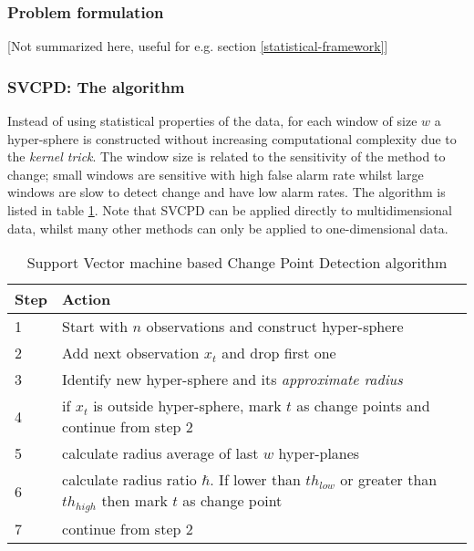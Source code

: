 \subsubsection{Problem formulation}
[Not summarized here, useful for e.g. section \ref{statistical-framework}]

\subsubsection{SVCPD: The algorithm}
Instead of using statistical properties of the data, for each window of size $w$ a hyper-sphere is constructed without increasing computational complexity due to the \emph{kernel trick}.
The window size is related to the sensitivity of the method to change; small windows are sensitive with high false alarm rate whilst large windows are slow to detect change and have low alarm rates.
The algorithm is listed in table \ref{tab:alg-svcdp}.
Note that SVCPD can be applied directly to multidimensional data, whilst many other methods can only be applied to one-dimensional data.

\begin{center}\begin{table}
\begin{tabular}{ l p{12cm} }
  \hline
  Step & Action \\
  \hline
  1 & Start with $n$ observations and construct hyper-sphere \\
  2 & Add next observation $x_t$ and drop first one \\
  3 & Identify new hyper-sphere and its \emph{approximate radius} \\
  4 & if $x_t$ is outside hyper-sphere, mark $t$ as change points and continue from step 2 \\
  5 & calculate radius average of last $w$ hyper-planes \\
  6 & calculate radius ratio $\hbar$. If lower than ${th}_{low}$ or greater than ${th}_{high}$ then mark $t$ as change point \\
  7 & continue from step 2 \\
  \hline
\end{tabular}
\caption{Support Vector machine based Change Point Detection algorithm}
\label{tab:alg-svcdp}
\end{table}\end{center}





